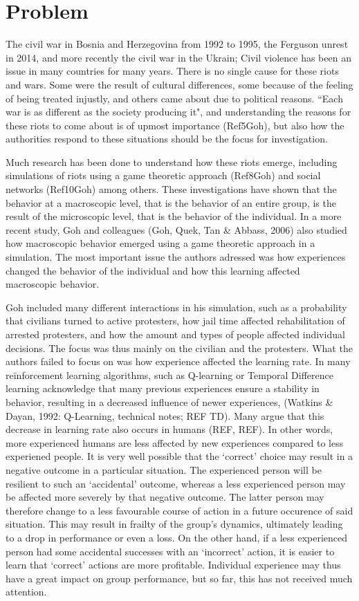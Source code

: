 \chapter{Problem}
The civil war in Bosnia and Herzegovina from 1992 to 1995, the Ferguson unrest in 2014, and more recently the civil war in the Ukrain; Civil violence has been an issue in many countries for many years. There is no single cause for these riots and wars. Some were the result of cultural differences, some because of the feeling of being treated injustly, and others came about due to political reasons. ``Each war is as different as the society producing it", and understanding the reasons for these riots to come about is of upmost importance (Ref5Goh), but also how the authorities respond to these situations should be the focus for investigation. 

Much research has been done to understand how these riots emerge, including simulations of riots using a game theoretic approach (Ref8Goh) and social networks (Ref10Goh) among others. These investigations have shown that the behavior at a macroscopic level, that is the behavior of an entire group, is the result of the microscopic level, that is the behavior of the individual. In a more recent study, Goh and colleagues (Goh, Quek, Tan \& Abbass, 2006) also studied how macroscopic behavior emerged using a game theoretic approach in a simulation. The most important issue the authors adressed was how experiences changed the behavior of the individual and how this learning affected macroscopic behavior. 

Goh included many different interactions in his simulation, such as a probability that civilians turned to active protesters, how jail time affected rehabilitation of arrested protesters, and how the amount and types of people affected individual decisions. The focus was thus mainly on the civilian and the protesters. What the authors failed to focus on was how experience affected the learning rate. In many re\"inforcement learning algorithms, such as Q-learning or Temporal Difference learning acknowledge that many previous experiences ensure a stability in behavior, resulting in a decreased influence of newer experiences,  (Watkins \& Dayan, 1992: Q-Learning, technical notes; REF TD). Many argue that this decrease in learning rate also occurs in humans (REF, REF). In other words, more experienced humans are less affected by new experiences compared to less experiened people. It is very well possible that the `correct' choice may result in a negative outcome in a particular situation. The experienced person will be resilient to such an `accidental' outcome, whereas a less experienced person may be affected more severely by that negative outcome. The latter person may therefore change to a less favourable course of action in a future occurence of said situation. This may result in frailty of the group's dynamics, ultimately leading to a drop in performance or even a loss. On the other hand, if a less experienced person had some accidental successes with an `incorrect' action, it is easier to learn that `correct' actions are more profitable. Individual experience may thus have a great impact on group performance, but so far, this has not received much attention. 

